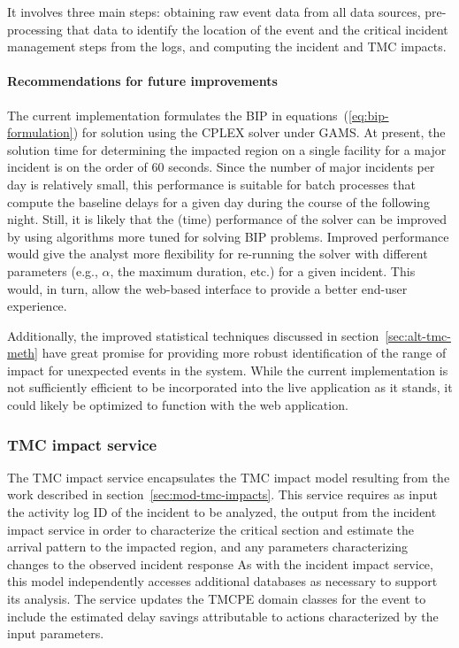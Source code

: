 \documentclass[12pt]{report}
\newcounter{time}
\begin{document}
It involves three main steps: obtaining raw event data from all data sources,
pre-processing that data to identify the location of the event and the critical
incident management steps from the logs, and computing the incident and TMC
impacts.


\paragraph{Recommendations for future improvements}

The current implementation formulates the \ac{BIP} in
equations~(\ref{eq:bip-formulation}) for solution using the \ac{CPLEX} solver
under \ac{GAMS}.  At present, the solution time for determining the impacted
region on a single facility for a major incident is on the order of 60 seconds.
Since the number of major incidents per day is relatively small, this
performance is suitable for batch processes that compute the baseline delays for
a given day during the course of the following night.  Still, it is likely that
the (time) performance of the solver can be improved by using algorithms more
tuned for solving \ac{BIP} problems.  Improved performance would give the
analyst more flexibility for re-running the solver with different parameters
(e.g., $\alpha$, the maximum duration, etc.) for a given incident.  This would,
in turn, allow the web-based interface to provide a better end-user experience.

Additionally, the improved statistical techniques discussed in
section~\ref{sec:alt-tmc-meth} have great promise for providing more robust
identification of the range of impact for unexpected events in the system.
While the current implementation is not sufficiently efficient to be
incorporated into the live application as it stands, it could likely be
optimized to function with the web application.


\subsubsection{TMC impact service}
\label{sec:tmc-impact-service}
The \ac{TMC} impact service encapsulates the \ac{TMC} impact model resulting
from the work described in section~\ref{sec:mod-tmc-impacts}.  This
service requires as input the activity log ID of the incident to be
analyzed, the output from the incident impact service in order to
characterize the critical section and estimate the arrival pattern to
the impacted region, and any parameters characterizing changes to the
observed incident response As with the incident impact service, this
model independently accesses additional databases as necessary to
support its analysis.  The service updates the \ac{TMCPE} domain classes
for the event to include the estimated delay savings attributable to
actions characterized by the input parameters.
\end{document}
